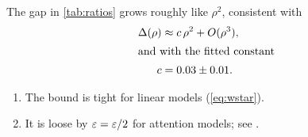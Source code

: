 \begin{remark}
  The gap in \cref{tab:ratios} grows roughly like $\rho^2$, consistent with
  \begin{align}
    \Delta(\rho) &\approx c\,\rho^2 + O(\rho^3), \notag \\
    \intertext{and with the fitted constant}
    c &= 0.03 \pm 0.01. \label{eq:fit}
  \end{align}
\end{remark}

\begin{enumerate}[label=(\roman*)]
  \item The bound is tight for linear models (\cref{eq:wstar}).
  \item It is loose by $\epsilon = \oldepsilon/2$ for attention models; see \citep{roe2022views,lee2024note}.
\end{enumerate}
